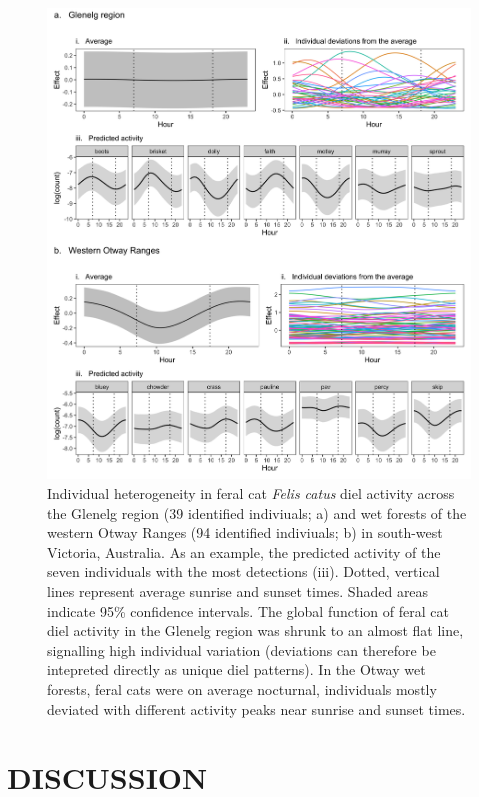 \documentclass[]{elsarticle} %
\begin{document}
\begin{figure}
\includegraphics[width=1\linewidth]{../figs/cat_ind} \caption{Individual heterogeneity in feral cat \textit{Felis catus} diel activity across the Glenelg region (39 identified indiviuals; a) and wet forests of the western Otway Ranges (94 identified indiviuals; b) in south-west Victoria, Australia. As an example, the predicted activity of the seven individuals with the most detections (iii). Dotted, vertical lines represent average sunrise and sunset times. Shaded areas indicate 95\% confidence intervals. The global function of feral cat diel activity in the Glenelg region was shrunk to an almost flat line, signalling high individual variation (deviations can therefore be intepreted directly as unique diel patterns). In the Otway wet forests, feral cats were on average nocturnal, individuals mostly deviated with different activity peaks near sunrise and sunset times.}\label{fig:ind}
\end{figure}

\newpage

\hypertarget{discussion}{%
\section{DISCUSSION}\label{discussion}}
\end{document}
